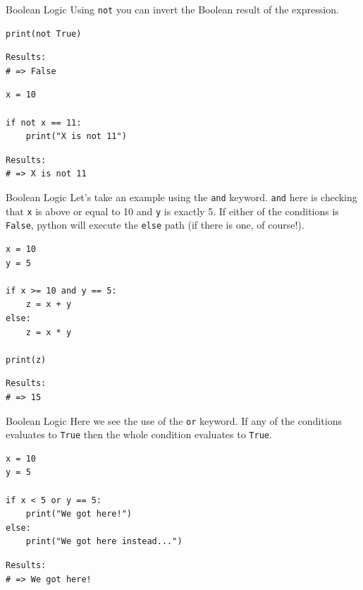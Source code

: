 \documentclass[10pt]{beamer}
\begin{document}
\begin{frame}[label={sec:org3c46aed},fragile]{Boolean Logic}
 Using \texttt{not} you can invert the Boolean result of the expression.

\begin{verbatim}
print(not True)
\end{verbatim}

\begin{verbatim}
Results: 
# => False
\end{verbatim}


\begin{verbatim}
x = 10

if not x == 11:
    print("X is not 11")
\end{verbatim}

\begin{verbatim}
Results: 
# => X is not 11
\end{verbatim}
\end{frame}

\begin{frame}[label={sec:org40c3d40},fragile]{Boolean Logic}
 Let's take an example using the \texttt{and} keyword. \texttt{and} here is checking that \texttt{x} is above or
equal to 10 \alert{and} \texttt{y} is exactly 5. If either of the conditions is \texttt{False}, python will
execute the \texttt{else} path (if there is one, of course!).

\begin{verbatim}
x = 10
y = 5

if x >= 10 and y == 5:
    z = x + y
else:
    z = x * y

print(z)
\end{verbatim}

\begin{verbatim}
Results: 
# => 15
\end{verbatim}
\end{frame}

\begin{frame}[label={sec:org336924b},fragile]{Boolean Logic}
 Here we see the use of the \texttt{or} keyword. If any of the conditions evaluates to \texttt{True}
then the whole condition evaluates to \texttt{True}.

\begin{verbatim}
x = 10
y = 5

if x < 5 or y == 5:
    print("We got here!")
else:
    print("We got here instead...")
\end{verbatim}

\begin{verbatim}
Results: 
# => We got here!
\end{verbatim}
\end{frame}
\end{document}
